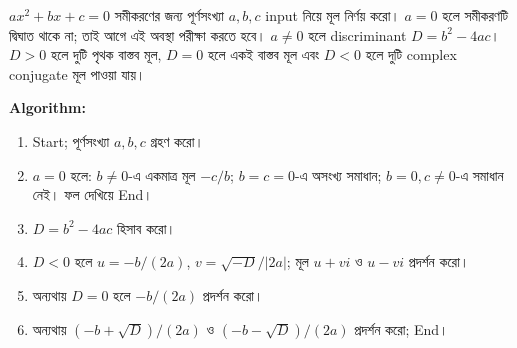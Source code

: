 \newcommand{\chFiveSeriesFlow}[3]{%
\begin{center}
\begin{tikzpicture}[node distance=5mm and 12mm,>=Stealth]
\node[fcstart] (s) {Start};
\node[fcio,below=of s] (input) {Input \(n\)};
\node[fcdecision,below=of input] (valid) {\(n<0\)?};
\node[fcio,right=16mm of valid,text width=24mm] (error) {Invalid input};
\node[fcstart,right=of error] (errorend) {End};
\node[fcprocess,below=of valid,text width=32mm] (init) {#1};
\node[fcdecision,below=of init] (test) {\(i\le n\)?};
\node[fcprocess,right=16mm of test,text width=38mm] (update) {#2\\\(i=i+1\)};
\node[fcio,below=8mm of test] (out) {#3};
\node[fcstart,below=of out] (end) {End};
\draw[fcarrow] (s)--(input);\draw[fcarrow] (input)--(valid);
\draw[fcarrow] (valid)--node[above,font=\small]{হ্যাঁ}(error);
\draw[fcarrow] (error)--(errorend);
\draw[fcarrow] (valid)--node[left,font=\small]{না}(init);
\draw[fcarrow] (init)--(test);
\draw[fcarrow] (test)--node[above,font=\small]{হ্যাঁ}(update);
\draw[fcarrow] (update.north)|-([yshift=2mm]test.north)--(test.north);
\draw[fcarrow] (test)--node[left,font=\small]{না}(out);
\draw[fcarrow] (out)--(end);
\end{tikzpicture}
\end{center}}
\clearpage
{}


\(ax^2+bx+c=0\) সমীকরণের জন্য পূর্ণসংখ্যা \(a,b,c\) input নিয়ে
মূল নির্ণয় করো। \(a=0\) হলে সমীকরণটি দ্বিঘাত থাকে না; তাই আগে এই
অবস্থা পরীক্ষা করতে হবে। \(a\ne0\) হলে discriminant
\(D=b^2-4ac\)। \(D>0\) হলে দুটি পৃথক বাস্তব মূল, \(D=0\) হলে
একই বাস্তব মূল এবং \(D<0\) হলে দুটি complex conjugate মূল পাওয়া যায়।

\textbf{Algorithm:}
\begin{enumerate}
\item Start; পূর্ণসংখ্যা \(a,b,c\) গ্রহণ করো।
\item \(a=0\) হলে: \(b\ne0\)-এ একমাত্র মূল \(-c/b\);
  \(b=c=0\)-এ অসংখ্য সমাধান; \(b=0,c\ne0\)-এ সমাধান নেই। ফল দেখিয়ে End।
\item \(D=b^2-4ac\) হিসাব করো।
\item \(D<0\) হলে \(u=-b/(2a)\), \(v=\sqrt{-D}/|2a|\);
  মূল \(u+vi\) ও \(u-vi\) প্রদর্শন করো।
\item অন্যথায় \(D=0\) হলে \(-b/(2a)\) প্রদর্শন করো।
\item অন্যথায় \((-b+\sqrt D)/(2a)\) ও \((-b-\sqrt D)/(2a)\)
  প্রদর্শন করো; End।
\end{enumerate}

